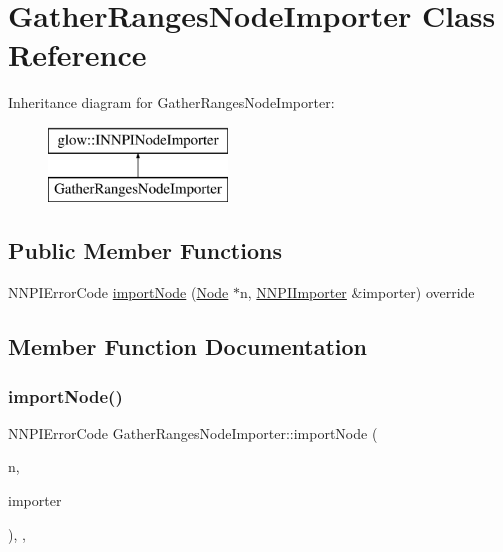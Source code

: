 \hypertarget{class_gather_ranges_node_importer}{}\section{Gather\+Ranges\+Node\+Importer Class Reference}
\label{class_gather_ranges_node_importer}
Inheritance diagram for Gather\+Ranges\+Node\+Importer\+:\begin{figure}[H]
\begin{center}
\leavevmode
\includegraphics[height=2.000000cm]{class_gather_ranges_node_importer}
\end{center}
\end{figure}
\subsection*{Public Member Functions}
\begin{DoxyCompactItemize}
\item 
N\+N\+P\+I\+Error\+Code \hyperlink{class_gather_ranges_node_importer_aeebc74b97264af12ebb612820d5b63f0}{import\+Node} (\hyperlink{classglow_1_1_node}{Node} $\ast$n, \hyperlink{classglow_1_1_n_n_p_i_importer}{N\+N\+P\+I\+Importer} \&importer) override
\end{DoxyCompactItemize}


\subsection{Member Function Documentation}
\mbox{\label{class_gather_ranges_node_importer_aeebc74b97264af12ebb612820d5b63f0}} 
\subsubsection{\texorpdfstring{import\+Node()}{importNode()}}
{\footnotesize\ttfamily N\+N\+P\+I\+Error\+Code Gather\+Ranges\+Node\+Importer\+::import\+Node (\begin{DoxyParamCaption}\item[{\hyperlink{classglow_1_1_node}{Node} $\ast$}]{n,  }\item[{\hyperlink{classglow_1_1_n_n_p_i_importer}{N\+N\+P\+I\+Importer} \&}]{importer }\end{DoxyParamCaption})\hspace{0.3cm}{\ttfamily [inline]}, {\ttfamily [override]}, {\ttfamily [virtual]}}

